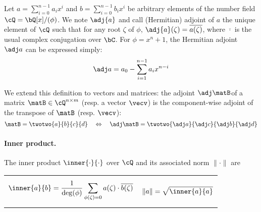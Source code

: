 Let $a =\sum_{i=0}^{n-1} a_i x^i$ and $b =\sum_{i=0}^{n-1} b_i x^i$ be arbitrary elements of the number field $\cQ = \bQ[x]/(\phi)$.
 We note $\adj{a}$ and call (Hermitian) adjoint of $a$ the unique element of $\cQ$ such that for any root $\zeta$ of $\phi$, $\adj{a}(\zeta) = \overline{a(\zeta)}$, where $\overline{\cdot}$ is the usual complex conjugation over $\bC$. For $\phi = x^n+1$, the Hermitian adjoint $\adj a$ can be expressed simply:
 \begin{equation}
 \adj a = a_0 - \sum_{i=1}^{n-1} a_{i} x^{n-i}
 \end{equation}

We extend this definition to vectors and matrices: the adjoint $\adj\matB$of a matrix $\matB \in \cQ^{n\times m}$ (resp. a vector $\vecv$) is the component-wise adjoint of the transpose of $\matB$ (resp. $\vecv$):
\begin{equation}
\matB = \twotwo{a}{b}{c}{d} \quad \Leftrightarrow \quad \adj \matB = \twotwo{\adj a}{\adj c}{\adj b}{\adj d}
\end{equation}

\paragraph{Inner product.} The inner product $\inner{\cdot}{\cdot}$ over $\cQ$ and its associated norm $\|\cdot\|$ are

\noindent
\begin{tabular}{@{}p{.5\linewidth}@{}p{.5\linewidth}@{}}
	\begin{equation}\label{eq:innerfft}
	\inner{a}{b} = \frac{1}{\deg(\phi)}\sum_{\phi(\zeta)=0} a(\zeta)\cdot \overline{b(\zeta)}
	\end{equation}
	&
	\begin{equation}\label{eq:norm}
	\|a\| = \sqrt{\inner{a}{a}}
	\end{equation}
\end{tabular}

